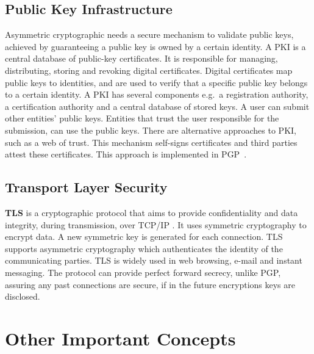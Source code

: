\subsection{Public Key Infrastructure}\label{chap:background:PKI}

Asymmetric cryptographic needs a secure mechanism to validate public keys, achieved by guaranteeing a public key is owned by a certain identity.
A \ac{PKI} is a central database of public-key certificates. It is responsible for managing, distributing, storing and revoking digital certificates. Digital certificates map public keys to identities, and are used to verify that a specific public key belongs to a certain identity.
A \ac{PKI} has several components e.g.\ a registration authority, a certification authority and a central database of stored keys.
A user can submit other entities' public keys. Entities that trust the user responsible for the submission, can use the public keys.
There are alternative approaches to \ac{PKI}, such as a web of trust. This mechanism self-signs certificates and third parties attest these certificates. This approach is implemented in \ac{PGP}~\cite{modelingPKI}.

\subsection{Transport Layer Security}\label{chap:background:TLS}

\textbf{\ac{TLS}} is a cryptographic protocol that aims to provide confidentiality and data integrity, during transmission, over TCP/IP \cite{rescorla2018transport}. It uses symmetric cryptography to encrypt data. A new symmetric key is generated for each connection.
\ac{TLS} supports asymmetric cryptography which authenticates the identity of the communicating parties.
\ac{TLS} is widely used in web browsing, e-mail and instant messaging.
The protocol can provide perfect forward secrecy, unlike \ac{PGP}, assuring any past connections are secure, if in the future encryptions keys are disclosed.

\section{Other Important Concepts}\label{chap:background:other}

